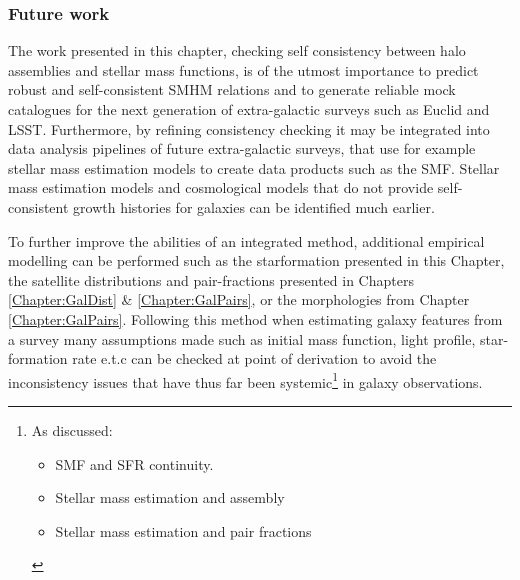 \subsubsection{Future work}
The work presented in this chapter, checking self consistency between \LCDM halo assemblies and stellar mass functions, is of the utmost importance to predict robust and self-consistent SMHM relations and to generate reliable mock catalogues for the next generation of extra-galactic surveys such as Euclid and LSST. Furthermore, by refining consistency checking it may be integrated into data analysis pipelines of future extra-galactic surveys, that use for example stellar mass estimation models to create data products such as the SMF. Stellar mass estimation models and cosmological models that do not provide self-consistent growth histories for galaxies can be identified much earlier. 

To further improve the abilities of an integrated method, additional empirical modelling can be performed such as the starformation presented in this Chapter, the satellite distributions and pair-fractions presented in Chapters \ref{Chapter:GalDist} \& \ref{Chapter:GalPairs}, or the morphologies from Chapter \ref{Chapter:GalPairs}. Following this method when estimating galaxy features from a survey many assumptions made such as initial mass function, light profile, star-formation rate e.t.c can be checked at point of derivation to avoid the inconsistency issues that have thus far been systemic\footnote{As discussed: \begin{itemize}
    \item SMF and SFR continuity.
    \item Stellar mass estimation and \LCDM assembly
    \item Stellar mass estimation and pair fractions
\end{itemize}} in galaxy observations. 
